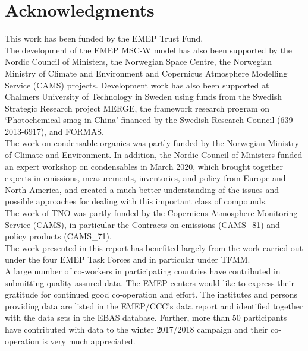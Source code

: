 \chapter*{Acknowledgments}

\enlargethispage{3\baselineskip}

\vspace{-2cm}


This work has been funded by the EMEP Trust Fund.\\

The development of the EMEP MSC-W model has also been supported by the Nordic Council of Ministers, the Norwegian Space Centre, the Norwegian Ministry of Climate and Environment and Copernicus Atmosphere Modelling Service (CAMS) projects.
Development work has also been supported at Chalmers University of Technology in Sweden using funds from the Swedish Strategic Research project MERGE, the 
framework research program on `Photochemical smog in China' financed by
the Swedish Research Council (639-2013-6917), and FORMAS.\\

The work on condensable organics was partly funded by the Norwegian Ministry of Climate and Environment. In addition, the Nordic Council of Ministers funded an expert workshop on condensables in March 2020, which brought together experts in emissions, measurements, inventories, and policy from Europe and North America, and created a much better understanding of the issues and possible approaches for dealing with this important class of compounds.\\

The work of TNO was partly funded
by the Copernicus Atmosphere Monitoring Service (CAMS),
in particular the Contracts on emissions (CAMS\_81) and policy products
(CAMS\_71).\\

The work presented in this report has benefited largely from the work carried out under the four EMEP Task Forces and in particular under TFMM.\\

A large number of co-workers in participating countries have contributed in submitting quality assured data. The EMEP centers would like to express their gratitude for continued good co-operation and effort. The institutes and persons providing data are listed in the EMEP/CCC's data report and identified together with the data sets in the EBAS database. Further, more than 50 participants have contributed with data to the winter 2017/2018 campaign and their co-operation is very much appreciated.\\

